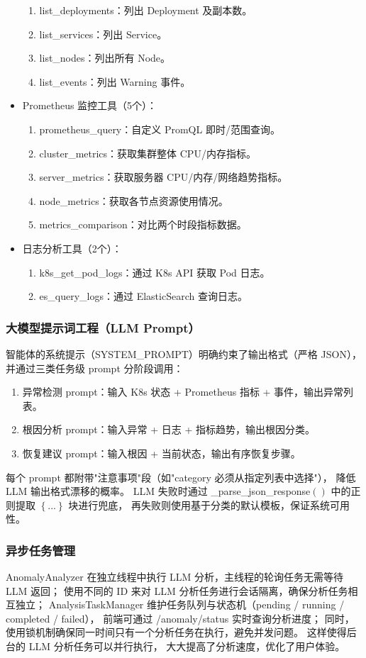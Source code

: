 \documentclass[a4paper,12pt]{report}
\begin{document}
\begin{spacing}{1.5}
\begin{itemize}
\begin{enumerate}
		\item list\_deployments：列出 Deployment 及副本数。
		\item list\_services：列出 Service。
		\item list\_nodes：列出所有 Node。
		\item list\_events：列出 Warning 事件。
	\end{enumerate}
	\item Prometheus 监控工具（5个）：
	\begin{enumerate}
		\item prometheus\_query：自定义 PromQL 即时/范围查询。
		\item cluster\_metrics：获取集群整体 CPU/内存指标。
		\item server\_metrics：获取服务器 CPU/内存/网络趋势指标。
		\item node\_metrics：获取各节点资源使用情况。
		\item metrics\_comparison：对比两个时段指标数据。
	\end{enumerate}
	\item 日志分析工具（2个）：
	\begin{enumerate}
		\item k8s\_get\_pod\_logs：通过 K8s API 获取 Pod 日志。
		\item es\_query\_logs：通过 ElasticSearch 查询日志。
	\end{enumerate}
\end{itemize}

\subsubsection{大模型提示词工程（LLM Prompt）}
智能体的系统提示（SYSTEM\_PROMPT）明确约束了输出格式（严格 JSON），并通过三类任务级 prompt 分阶段调用：
\begin{enumerate}
	\item 异常检测 prompt：输入 K8s 状态 + Prometheus 指标 + 事件，输出异常列表。
	\item 根因分析 prompt：输入异常 + 日志 + 指标趋势，输出根因分类。
	\item 恢复建议 prompt：输入根因 + 当前状态，输出有序恢复步骤。
\end{enumerate}
每个 prompt 都附带"注意事项"段（如"category 必须从指定列表中选择"），
降低 LLM 输出格式漂移的概率。
LLM 失败时通过 \_parse\_json\_response$\left( \right)$ 中的正则提取 $\left\{...\right\}$ 块进行兜底，
再失败则使用基于分类的默认模板，保证系统可用性。

\subsubsection{异步任务管理}
AnomalyAnalyzer 在独立线程中执行 LLM 分析，主线程的轮询任务无需等待 LLM 返回；
使用不同的 ID 来对 LLM 分析任务进行会话隔离，确保分析任务相互独立；
AnalysisTaskManager 维护任务队列与状态机（pending / running / completed / failed），
前端可通过 /anomaly/status 实时查询分析进度；
同时，使用锁机制确保同一时间只有一个分析任务在执行，避免并发问题。
这样使得后台的 LLM 分析任务可以并行执行，
大大提高了分析速度，优化了用户体验。


\end{spacing}
\end{document}
